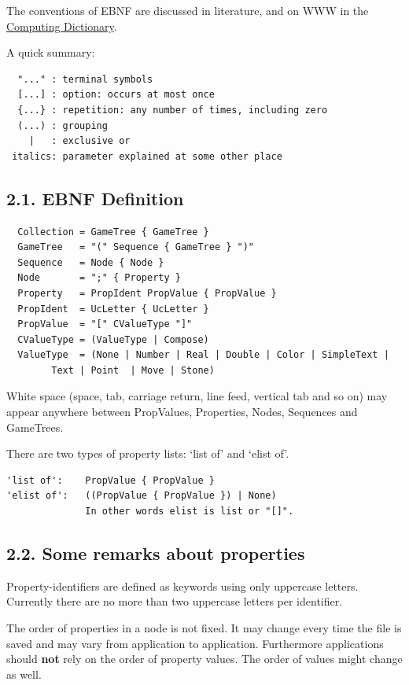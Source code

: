 The conventions of EBNF are discussed in literature, and on WWW in the
\href{http://www.instantweb.com/foldoc/foldoc.cgi?Backus-Naur+Form}{Computing
Dictionary}.

A quick summary:

\begin{verbatim}
  "..." : terminal symbols
  [...] : option: occurs at most once
  {...} : repetition: any number of times, including zero
  (...) : grouping
    |   : exclusive or
 italics: parameter explained at some other place
\end{verbatim}

\subsection{2.1. EBNF Definition}\label{ebnf-definition}

\begin{verbatim}
  Collection = GameTree { GameTree }
  GameTree   = "(" Sequence { GameTree } ")"
  Sequence   = Node { Node }
  Node       = ";" { Property }
  Property   = PropIdent PropValue { PropValue }
  PropIdent  = UcLetter { UcLetter }
  PropValue  = "[" CValueType "]"
  CValueType = (ValueType | Compose)
  ValueType  = (None | Number | Real | Double | Color | SimpleText |
        Text | Point  | Move | Stone)
\end{verbatim}

White space (space, tab, carriage return, line feed, vertical tab and so
on) may appear anywhere between PropValues, Properties, Nodes, Sequences
and GameTrees.

There are two types of property lists: `list of' and `elist of'.

\begin{verbatim}
'list of':    PropValue { PropValue }
'elist of':   ((PropValue { PropValue }) | None)
              In other words elist is list or "[]".
\end{verbatim}

\subsection{2.2. Some remarks about
properties}\label{some-remarks-about-properties}

Property-identifiers are defined as keywords using only uppercase
letters. Currently there are no more than two uppercase letters per
identifier.

The order of properties in a node is not fixed. It may change every time
the file is saved and may vary from application to application.
Furthermore applications should \textbf{not} rely on the order of
property values. The order of values might change as well.

